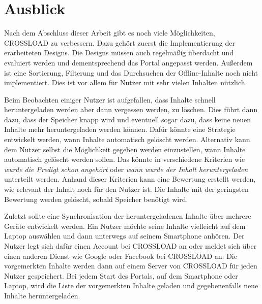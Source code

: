 \section{Ausblick}
Nach dem Abschluss dieser Arbeit gibt es noch viele Möglichkeiten, CROSSLOAD zu verbessern. Dazu gehört zuerst die Implementierung der erarbeiteten Designs. Die Designs müssen auch regelmäßig überdacht und evaluiert werden und dementsprechend das Portal angepasst werden. Außerdem ist eine Sortierung, Filterung und das Durchsuchen der Offline-Inhalte noch nicht implementiert. Dies ist vor allem für Nutzer mit sehr vielen Inhalten nützlich. 

Beim Beobachten einiger Nutzer ist aufgefallen, dass Inhalte schnell heruntergeladen werden aber dann vergessen werden, zu löschen. Dies führt dann dazu, dass der Speicher knapp wird und eventuell sogar dazu, dass keine neuen Inhalte mehr heruntergeladen werden können. Dafür könnte eine Strategie entwickelt werden, wann Inhalte automatisch gelöscht werden. Alternativ kann dem Nutzer selbst die Möglichkeit gegeben werden einzustellen, wann Inhalte automatisch gelöscht werden sollen. Das könnte in verschiedene Kriterien wie \textit{wurde die Predigt schon angehört} oder \textit{wann wurde der Inhalt heruntergeladen} unterteilt werden. Anhand dieser Kriterien kann eine Bewertung erstellt werden, wie relevant der Inhalt noch für den Nutzer ist. Die Inhalte mit der geringsten Bewertung werden gelöscht, sobald Speicher benötigt wird.

Zuletzt sollte eine Synchronisation der heruntergeladenen Inhalte über mehrere Geräte entwickelt werden. Ein Nutzer möchte seine Inhalte vielleicht auf dem Laptop auswählen und dann unterwegs auf seinem Smartphone anhören. Der Nutzer legt sich dafür einen Account bei CROSSLOAD an oder meldet sich über einen anderen Dienst wie Google oder Facebook bei CROSSLOAD an. Die vorgemerkten Inhalte werden dann auf einem Server von CROSSLOAD für jeden Nutzer gespeichert. Bei jedem Start des Portals, auf dem Smartphone oder Laptop, wird die Liste der vorgemerkten Inhalte geladen und gegebenenfalls neue Inhalte heruntergeladen. 
